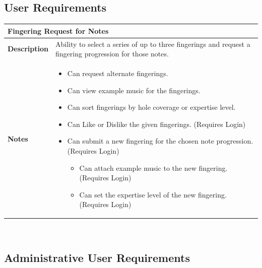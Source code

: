 \documentclass[12pt,english]{article}
\providecommand{\tabularnewline}{\\}
\begin{document}
\subsection{User Requirements}

\begin{tabular}{|p{3cm}|p{13cm}|}
\hline 
\multicolumn{2}{|l|}{\textbf{Fingering Request for Notes}}\tabularnewline
\hline 
\textbf{Description}  & Ability to select a series of up to three fingerings and request a
fingering progression for those notes. \tabularnewline
\hline 
\textbf{Notes}  & \begin{itemize}
\item Can request alternate fingerings. 
\item Can view example music for the fingerings. 
\item Can sort fingerings by hole coverage or expertise level. 
\item Can \textquotedbl{}Like\textquotedbl{} or \textquotedbl{}Dislike\textquotedbl{}
the given fingerings. (Requires Login) 
\item Can submit a new fingering for the chosen note progression. (Requires
Login) 

\begin{itemize}
\item Can attach example music to the new fingering. (Requires Login) 
\item Can set the expertise level of the new fingering. (Requires Login) \end{itemize}
\end{itemize}
\tabularnewline
\hline 
\end{tabular}\\[0.5cm]


\subsection{Administrative User Requirements}
\end{document}
